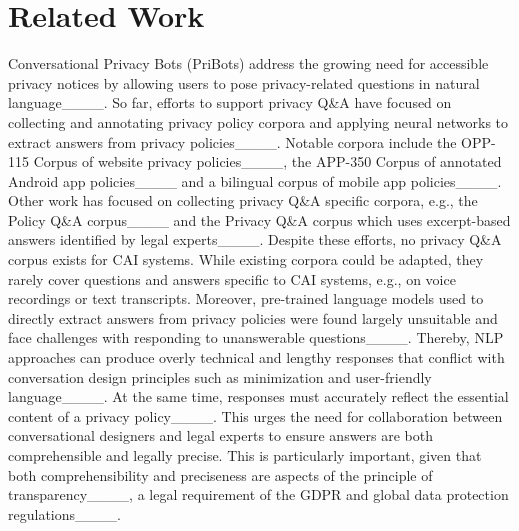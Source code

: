 \section{Related Work}
Conversational Privacy Bots (PriBots) address the growing need for accessible privacy notices by allowing users to pose privacy-related questions in natural language____. %
So far, efforts to support privacy Q\&A have focused on collecting and annotating privacy policy corpora and applying neural networks to extract answers from privacy policies____. Notable corpora include the OPP-115 Corpus of website privacy policies____, the APP-350 Corpus of annotated Android app policies____ and a bilingual corpus of mobile app policies____. Other work has focused on collecting privacy Q\&A specific corpora, e.g., the Policy Q\&A corpus____ and the Privacy Q\&A corpus which uses excerpt-based answers identified by legal experts____. Despite these efforts, no privacy Q\&A corpus exists for CAI systems. While existing corpora could be adapted, they rarely cover questions and answers specific to CAI systems, e.g., on voice recordings or text transcripts.
Moreover, pre-trained language models used to directly extract answers from privacy policies were found largely unsuitable and face challenges with responding to unanswerable questions____. Thereby, NLP approaches can produce overly technical and lengthy responses that conflict with conversation design principles such as minimization and user-friendly language____. At the same time, responses must accurately reflect the essential content of a privacy policy____. This urges the need for collaboration between conversational designers and legal experts to ensure answers are both comprehensible and legally precise. This is particularly important, given that both comprehensibility and preciseness are aspects of the principle of transparency____, a legal requirement of the GDPR and global data protection regulations____. 


